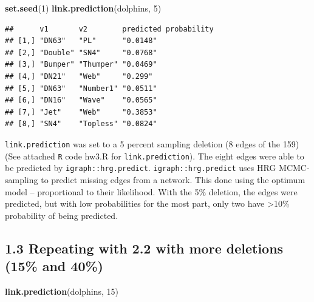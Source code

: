 \documentclass[]{article}
\newenvironment{Shaded}{\begin{snugshade}}{\end{snugshade}}
\newcommand{\KeywordTok}[1]{\textcolor[rgb]{0.13,0.29,0.53}{\textbf{{#1}}}}
\newcommand{\DecValTok}[1]{\textcolor[rgb]{0.00,0.00,0.81}{{#1}}}
\newcommand{\NormalTok}[1]{{#1}}
\begin{document}
\begin{Shaded}
\begin{Highlighting}[]
\KeywordTok{set.seed}\NormalTok{(}\DecValTok{1}\NormalTok{)}
\KeywordTok{link.prediction}\NormalTok{(dolphins, }\DecValTok{5}\NormalTok{)}
\end{Highlighting}
\end{Shaded}

\begin{verbatim}
##      v1       v2        predicted probability
## [1,] "DN63"   "PL"      "0.0148"             
## [2,] "Double" "SN4"     "0.0768"             
## [3,] "Bumper" "Thumper" "0.0469"             
## [4,] "DN21"   "Web"     "0.299"              
## [5,] "DN63"   "Number1" "0.0511"             
## [6,] "DN16"   "Wave"    "0.0565"             
## [7,] "Jet"    "Web"     "0.3853"             
## [8,] "SN4"    "Topless" "0.0824"
\end{verbatim}

\texttt{link.prediction} was set to a 5 percent sampling deletion (8
edges of the 159) (See attached \texttt{R} code hw3.R for
\texttt{link.prediction}). The eight edges were able to be predicted by
\texttt{igraph::hrg.predict}. \texttt{igraph::hrg.predict} uses HRG
MCMC-sampling to predict missing edges from a network. This done using
the optimum model -- proportional to their likelihood. With the 5\%
deletion, the edges were predicted, but with low probabilities for the
most part, only two have \textgreater{}10\% probability of being
predicted.

\subsection{1.3 Repeating with 2.2 with more deletions (15\% and
40\%)}\label{repeating-with-2.2-with-more-deletions-15-and-40}

\begin{Shaded}
\begin{Highlighting}[]
\KeywordTok{link.prediction}\NormalTok{(dolphins, }\DecValTok{15}\NormalTok{)}
\end{Highlighting}
\end{Shaded}
\end{document}
